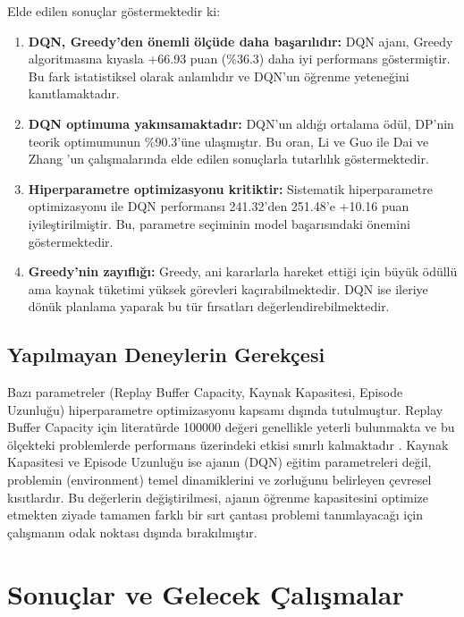 \documentclass[onecolumn]{IEEEtran}
\begin{document}
Elde edilen sonuçlar göstermektedir ki:

\begin{enumerate}
\item \textbf{DQN, Greedy'den önemli ölçüde daha başarılıdır:} DQN ajanı, Greedy algoritmasına kıyasla +66.93 puan (\%36.3) daha iyi performans göstermiştir. Bu fark istatistiksel olarak anlamlıdır ve DQN'un öğrenme yeteneğini kanıtlamaktadır.

\item \textbf{DQN optimuma yakınsamaktadır:} DQN'un aldığı ortalama ödül, DP'nin teorik optimumunun \%90.3'üne ulaşmıştır. Bu oran, Li ve Guo \cite{li2026deep} ile Dai ve Zhang \cite{dai2025djaya}'un çalışmalarında elde edilen sonuçlarla tutarlılık göstermektedir.

\item \textbf{Hiperparametre optimizasyonu kritiktir:} Sistematik hiperparametre optimizasyonu ile DQN performansı 241.32'den 251.48'e +10.16 puan iyileştirilmiştir. Bu, parametre seçiminin model başarısındaki önemini göstermektedir.

\item \textbf{Greedy'nin zayıflığı:} Greedy, ani kararlarla hareket ettiği için büyük ödüllü ama kaynak tüketimi yüksek görevleri kaçırabilmektedir. DQN ise ileriye dönük planlama yaparak bu tür fırsatları değerlendirebilmektedir.
\end{enumerate}

\subsection{Yapılmayan Deneylerin Gerekçesi}

Bazı parametreler (Replay Buffer Capacity, Kaynak Kapasitesi, Episode Uzunluğu) hiperparametre optimizasyonu kapsamı dışında tutulmuştur. Replay Buffer Capacity için literatürde 100000 değeri genellikle yeterli bulunmakta ve bu ölçekteki problemlerde performans üzerindeki etkisi sınırlı kalmaktadır \cite{mnih2015human}. Kaynak Kapasitesi ve Episode Uzunluğu ise ajanın (DQN) eğitim parametreleri değil, problemin (environment) temel dinamiklerini ve zorluğunu belirleyen çevresel kısıtlardır. Bu değerlerin değiştirilmesi, ajanın öğrenme kapasitesini optimize etmekten ziyade tamamen farklı bir sırt çantası problemi tanımlayacağı için çalışmanın odak noktası dışında bırakılmıştır.

\section{Sonuçlar ve Gelecek Çalışmalar}
\end{document}
